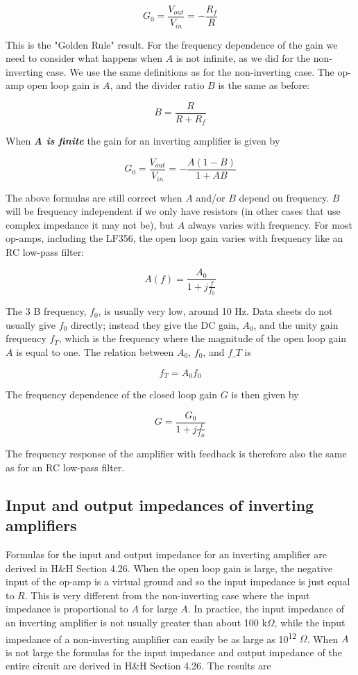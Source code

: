 \documentclass[10pt]{PhysLab1C} %
\begin{document}
\[G_0=\frac{V_{out}}{V_{in}}=-\frac{R_f}{R}\]

This is the "Golden Rule" result. For the frequency dependence of the
gain we need to consider what happens when $A$ is not infinite, as we did
for the non-inverting case. We use the same definitions as for the
non-inverting case. The op-amp open loop gain is $A$, and the divider
ratio $B$ is the same as before:

\[B=\frac{R}{R+R_f}\]

When \emph{\textbf{A is finite}} the gain for an inverting amplifier is
given by

\[G_0=\frac{V_{out}}{V_{in}}=-\frac{A(1-B)}{1+AB}\]

The above formulas are still correct when \(A\) and/or \(B\) depend on
frequency. \(B\) will be frequency independent if we only have resistors
(in other cases that use complex impedance it may not be), but \(A\)
always varies with frequency. For most op-amps, including the LF356, the
open loop gain varies with frequency like an RC low-pass filter:

\[A(f)=\frac{A_0}{1+j\frac{f}{f_0}}\]

The 3 B frequency, \(f_0\), is usually very low, around 10 Hz. Data
sheets do not usually give \(f_0\) directly; instead they give the DC
gain, $A_0$, and the unity gain frequency \(f_T\), which is the frequency
where the magnitude of the open loop gain \(A\) is equal to one. The
relation between \(A_0\), \(f_0\), and $f\_T$ is

\[f_{T} = A_{0}f_{0}\]

The frequency dependence of the closed loop gain $G$ is then given by

\[G=\frac{G_0}{1+j\frac{f}{f_B}}\]

The frequency response of the amplifier with feedback is therefore also
the same as for an RC low-pass filter.

\subsection{Input and output impedances of inverting amplifiers}

Formulas for the input and output impedance for an inverting amplifier
are derived in H\&H Section 4.26. When the open loop gain is large, the
negative input of the op-amp is a virtual ground and so the input
impedance is just equal to $R$. This is very different from the
non-inverting case where the input impedance is proportional to $A$ for
large $A$. In practice, the input impedance of an inverting amplifier is
not usually greater than about 100 k$\Omega$, while the input impedance of a
non-inverting amplifier can easily be as large as 10\textsuperscript{12}
$\Omega$. When $A$ is not large the formulas for the input impedance and output
impedance of the entire circuit are derived in H\&H Section 4.26. The
results are
\end{document}
